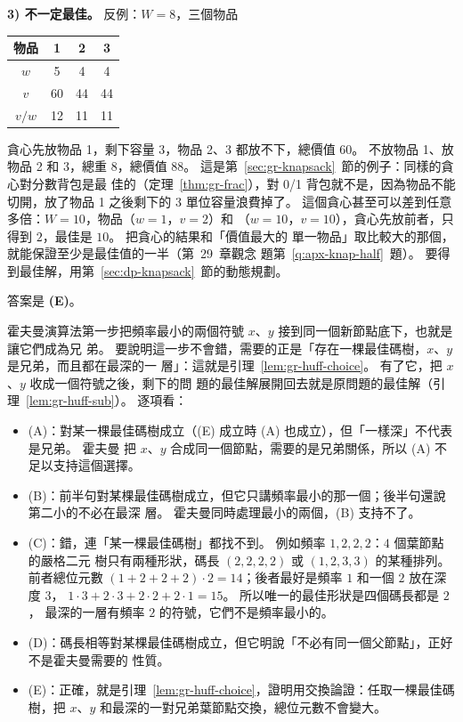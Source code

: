 \textbf{3) 不一定最佳。} 反例：$W = 8$，三個物品
\begin{center}
\begin{tabular}{cccc}
\toprule
物品 & 1 & 2 & 3 \\
\midrule
$w$ & 5 & 4 & 4 \\
$v$ & 60 & 44 & 44 \\
$v / w$ & 12 & 11 & 11 \\
\bottomrule
\end{tabular}
\end{center}
貪心先放物品 1，剩下容量 $3$，物品 2、3 都放不下，總價值 $60$。 不放物品 1、放物品 2 和
3，總重 $8$，總價值 $88$。 這是第~\ref{sec:gr-knapsack}~節的例子：同樣的貪心對分數背包是最
佳的（定理~\ref{thm:gr-frac}），對 0/1 背包就不是，因為物品不能切開，放了物品 1 之後剩下的
$3$ 單位容量浪費掉了。 這個貪心甚至可以差到任意多倍：$W = 10$，物品（$w = 1$，$v = 2$）和
（$w = 10$，$v = 10$），貪心先放前者，只得到 $2$，最佳是 $10$。 把貪心的結果和「價值最大的
單一物品」取比較大的那個，就能保證至少是最佳值的一半（第~29~章觀念
題第~\ref{q:apx-knap-half}~題）。 要得到最佳解，用第~\ref{sec:dp-knapsack}~節的動態規劃。

答案是 \textbf{(E)}。

霍夫曼演算法第一步把頻率最小的兩個符號 $x$、$y$ 接到同一個新節點底下，也就是讓它們成為兄
弟。 要說明這一步不會錯，需要的正是「存在一棵最佳碼樹，$x$、$y$ 是兄弟，而且都在最深的一
層」：這就是引理~\ref{lem:gr-huff-choice}。 有了它，把 $x$、$y$ 收成一個符號之後，剩下的問
題的最佳解展開回去就是原問題的最佳解（引理~\ref{lem:gr-huff-sub}）。 逐項看：

\begin{itemize}
\item (A)：對某一棵最佳碼樹成立（(E) 成立時 (A) 也成立），但「一樣深」不代表是兄弟。 霍夫曼
把 $x$、$y$ 合成同一個節點，需要的是兄弟關係，所以 (A) 不足以支持這個選擇。
\item (B)：前半句對某棵最佳碼樹成立，但它只講頻率最小的那一個；後半句還說第二小的不必在最深
層。 霍夫曼同時處理最小的兩個，(B) 支持不了。
\item (C)：錯，連「某一棵最佳碼樹」都找不到。 例如頻率 $1, 2, 2, 2$：$4$ 個葉節點的嚴格二元
樹只有兩種形狀，碼長 $(2, 2, 2, 2)$ 或 $(1, 2, 3, 3)$ 的某種排列。 前者總位元數
$(1 + 2 + 2 + 2) \cdot 2 = 14$；後者最好是頻率 $1$ 和一個 $2$ 放在深度 $3$，
$1 \cdot 3 + 2 \cdot 3 + 2 \cdot 2 + 2 \cdot 1 = 15$。 所以唯一的最佳形狀是四個碼長都是 $2$，
最深的一層有頻率 $2$ 的符號，它們不是頻率最小的。
\item (D)：碼長相等對某棵最佳碼樹成立，但它明說「不必有同一個父節點」，正好不是霍夫曼需要的
性質。
\item (E)：正確，就是引理~\ref{lem:gr-huff-choice}，證明用交換論證：任取一棵最佳碼樹，把
$x$、$y$ 和最深的一對兄弟葉節點交換，總位元數不會變大。
\end{itemize}

